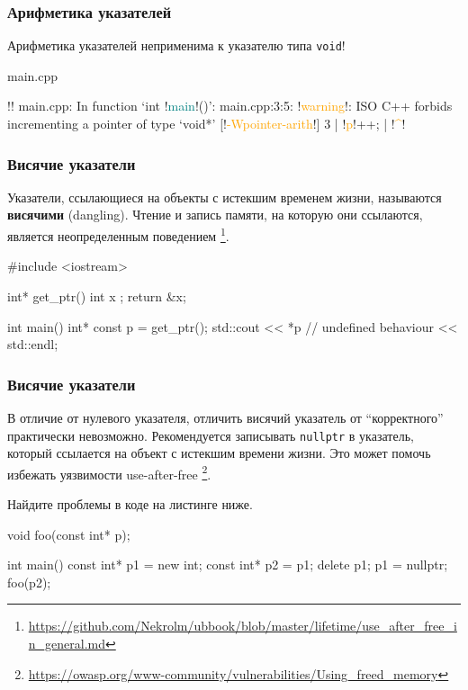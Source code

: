 \documentclass[compress, 8pt]{beamer}
\begin{document}
\begin{frame}[fragile]

    \frametitle{Арифметика указателей}

    Арифметика указателей неприменима к указателю типа \verb|void|!

        {main.cpp}

    \begin{terminalwindow}
!!
main.cpp: In function ‘int !\textcolor{teal}{main}!()’:
main.cpp:3:5: !\textcolor{orange}{warning}!: ISO C++ forbids incrementing a pointer of type ‘void*’ [!\textcolor{orange}{-Wpointer-arith}!]
    3 |     !\textcolor{orange}{p}!++;
      |     !\textcolor{orange}{\^{}}!
    \end{terminalwindow}

\end{frame}

\begin{frame}[fragile]

    \frametitle{Висячие указатели}

    Указатели, ссылающиеся на объекты с истекшим временем жизни,
    называются \textbf{висячими} (dangling).
    Чтение и запись памяти, на которую они ссылаются, является неопределенным
    поведением
    \footnote{\url{https://github.com/Nekrolm/ubbook/blob/master/lifetime/use\_after\_free\_in\_general.md}}.

    \begin{myinplacelisting}[minted language=cpp]
#include <iostream>

int* get_ptr() {
    int x {};
    return &x;
}

int main() {
    int* const p = get_ptr();
    std::cout << *p // undefined behaviour
        << std::endl;
}
    \end{myinplacelisting}

\end{frame}

\begin{frame}[fragile]

    \frametitle{Висячие указатели}

    В отличие от нулевого указателя, отличить висячий указатель от
    \enquote{корректного} практически невозможно.
    Рекомендуется записывать \verb|nullptr| в указатель, который ссылается
    на объект с истекшим времени жизни.
    Это может помочь избежать уязвимости use-after-free
    \footnote{\url{https://owasp.org/www-community/vulnerabilities/Using\_freed\_memory}}.

    \begin{task}
        Найдите проблемы в коде на листинге ниже.
    \end{task}

    \begin{myinplacelisting}[minted language=cpp]
void foo(const int* p);

int main() {
    const int* p1 = new int;
    const int* p2 = p1;
    delete p1;
    p1 = nullptr;
    foo(p2);
}
    \end{myinplacelisting}

\end{frame}
\end{document}
